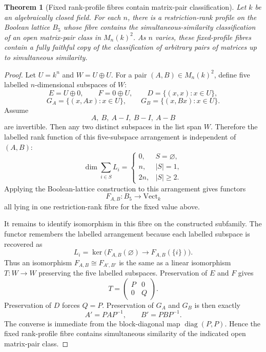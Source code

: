 \documentclass[11pt]{article}
\newtheorem{theorem}{Theorem}[section]
\begin{document}
\begin{theorem}[Fixed rank-profile fibres contain matrix-pair classification]
Let \(k\) be an algebraically closed field. For each \(n\), there is a restriction-rank profile on the Boolean lattice \(B_5\) whose fibre contains the simultaneous-similarity classification of an open matrix-pair class in \(M_n(k)^2\). As \(n\) varies, these fixed-profile fibres contain a fully faithful copy of the classification of arbitrary pairs of matrices up to simultaneous similarity.
\end{theorem}

\begin{proof}
Let \(U=k^n\) and \(W=U\oplus U\). For a pair \((A,B)\in M_n(k)^2\), define five labelled \(n\)-dimensional subspaces of \(W\):
\[
E=U\oplus0,
\qquad
F=0\oplus U,
\qquad
D=\{(x,x):x\in U\},
\]
\[
G_A=\{(x,Ax):x\in U\},
\qquad
G_B=\{(x,Bx):x\in U\}.
\]
Assume
\[
A,\ B,\ A-I,\ B-I,\ A-B
\]
are invertible. Then any two distinct subspaces in the list span \(W\). Therefore the labelled rank function of this five-subspace arrangement is independent of \((A,B)\):
\[
\dim\sum_{i\in S}L_i=
\begin{cases}
0,&S=\varnothing,\\
n,&|S|=1,\\
2n,&|S|\geq2.
\end{cases}
\]
Applying the Boolean-lattice construction to this arrangement gives functors
\[
F_{A,B}:B_5\to\mathrm{Vect}_k
\]
all lying in one restriction-rank fibre for the fixed value above.

It remains to identify isomorphism in this fibre on the constructed subfamily. The functor remembers the labelled arrangement because each labelled subspace is recovered as
\[
L_i=\ker\bigl(F_{A,B}(\varnothing)\to F_{A,B}(\{i\})\bigr).
\]
Thus an isomorphism \(F_{A,B}\cong F_{A',B'}\) is the same as a linear isomorphism \(T:W\to W\) preserving the five labelled subspaces. Preservation of \(E\) and \(F\) gives
\[
T=
\begin{pmatrix}
P&0\\
0&Q
\end{pmatrix}.
\]
Preservation of \(D\) forces \(Q=P\). Preservation of \(G_A\) and \(G_B\) is then exactly
\[
A'=PAP^{-1},
\qquad
B'=PBP^{-1}.
\]
The converse is immediate from the block-diagonal map \(\operatorname{diag}(P,P)\). Hence the fixed rank-profile fibre contains simultaneous similarity of the indicated open matrix-pair class.


\end{proof}
\end{document}
